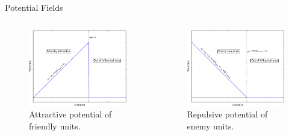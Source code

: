 \documentclass{beamer}
\begin{document}
\begin{frame}{Potential Fields}
\begin{columns}[c] %
\begin{figure}[h]
	\includegraphics[width=1.0\linewidth]{friend-crop.pdf}
	\caption{Attractive potential of friendly units.}
	\label{fig:graph_friend}
\end{figure}
\begin{figure}[h]
	\includegraphics[width=1.0\linewidth]{enemy1-crop.pdf}
	\caption{Repulsive potential of enemy units.}
	\label{fig:graph_enemy1}
\end{figure}
\end{columns}
\end{frame}
\end{document}
